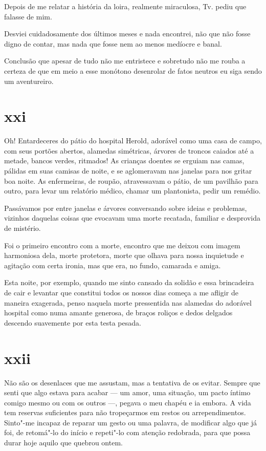 \asterisc

Depois de me relatar a história da loira, realmente miraculosa,
Tv. pediu que falasse de mim.

Desviei cuidadosamente dos últimos meses e nada encontrei, não que não
fosse digno de contar, mas nada que fosse nem ao menos medíocre e banal.

Conclusão que apesar de tudo não me entristece e sobretudo não me
rouba a certeza de que em meio a esse monótono desenrolar de fatos
neutros eu siga sendo um aventureiro.

\section{xxi}

Oh! Entardeceres do pátio do hospital Herold, adorável como uma casa de
campo, com seus portões abertos, alamedas simétricas, árvores de troncos
caiados até a metade, bancos verdes, ritmados! As crianças doentes se
erguiam nas camas, pálidas em suas camisas de noite, e se aglomeravam
nas janelas para nos gritar boa noite. As enfermeiras, de roupão,
atravessavam o pátio, de um pavilhão para outro, para levar um relatório
médico, chamar um plantonista, pedir um remédio.

Passávamos por entre janelas e árvores conversando sobre ideias e
problemas, vizinhos daquelas coisas que evocavam uma morte recatada,
familiar e desprovida de mistério.

Foi o primeiro encontro com a morte, encontro que me deixou com
imagem harmoniosa dela, morte protetora, morte que olhava para nossa
inquietude e agitação com certa ironia, mas que era, no fundo, camarada
e amiga.

Esta noite, por exemplo, quando me sinto cansado da solidão e
essa brincadeira de cair e levantar que constitui todos os
nossos dias começa a me afligir de maneira exagerada, penso naquela
morte pressentida nas alamedas do adorável hospital como numa amante
generosa, de braços roliços e dedos delgados descendo suavemente por
esta testa pesada.

\section{xxii}

Não são os desenlaces que me assustam, mas a tentativa de os evitar. Sempre que
senti que algo estava para acabar --- um amor, uma situação, um pacto
íntimo comigo mesmo ou com os outros ---, pegava o meu chapéu e ia embora.
A vida tem reservas suficientes para não tropeçarmos em restos ou
arrependimentos. Sinto"-me incapaz de reparar um gesto ou uma palavra, de
modificar algo que já foi, de retomá"-lo do início e repeti"-lo
com atenção redobrada, para que possa durar hoje aquilo que quebrou
ontem.

